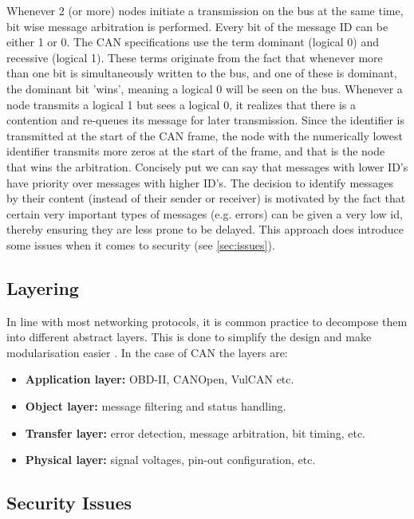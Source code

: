 Whenever 2 (or more) nodes initiate a transmission on the bus at the same time, bit wise message arbitration is performed. Every bit of the message ID can be either 1 or 0. The CAN specifications use the term dominant (logical 0) and recessive (logical 1). These terms originate from the fact that whenever more than one bit is simultaneously written to the bus, and one of these is dominant, the dominant bit 'wins', meaning a logical 0 will be seen on the bus. Whenever a node transmits a logical 1 but sees a logical 0, it realizes that there is a contention and re-queues its message for later transmission. Since the identifier is transmitted at the start of the CAN frame, the node with the numerically lowest identifier transmits more zeros at the start of the frame, and that is the node that wins the arbitration. Concisely put we can say that messages with lower ID's have priority over messages with higher ID's. The decision to identify messages by their content (instead of their sender or receiver) is motivated by the fact that certain very important types of messages (e.g. errors) can be given a very low id, thereby ensuring they are less prone to be delayed. This approach does introduce some issues when it comes to security (see \ref{sec:issues}).

\subsection{Layering}
\label{subsec:can:layering}

In line with most networking protocols, it is common practice to decompose them into different abstract layers. This is done to simplify the design and make modularisation easier \cite{wiki:ProtocolStack}. In the case of CAN the layers are:

\begin{itemize}
	\item \textbf{Application layer:} OBD-II, CANOpen, VulCAN etc.
	\item \textbf{Object layer:} message filtering and status handling.
	\item \textbf{Transfer layer:} error detection, message arbitration, bit timing, etc.
	\item \textbf{Physical layer:} signal voltages, pin-out configuration, etc.
\end{itemize}

\subsection{Security Issues}
\label{subsec:can:security_issues}

